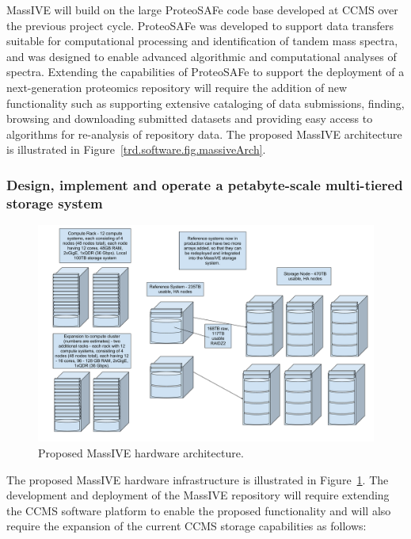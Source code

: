 \documentclass[arial,11pt]{article}
\begin{document}
MassIVE will build on the large ProteoSAFe code base developed at CCMS over the previous project cycle. ProteoSAFe was developed to support data transfers suitable for computational processing and identification of tandem mass spectra, and was designed to enable advanced algorithmic and  computational analyses of spectra. Extending the capabilities of ProteoSAFe to support the deployment of a next-generation proteomics repository will require the addition of new functionality such as supporting extensive cataloging of data submissions, finding, browsing and downloading submitted datasets and providing easy access to algorithms for re-analysis of repository data. The proposed MassIVE architecture is illustrated in Figure~\ref{trd.software.fig.massiveArch}.


\subsubsection{Design, implement and operate a petabyte-scale multi-tiered storage system}

\begin{figure}[t]
  \centering
  \includegraphics[width=\textwidth]{figures/MassIVE_hardware.pdf}
  \caption{\footnotesize Proposed MassIVE hardware architecture.}
  \label{trd.software.fig.massiveHardware}
\end{figure}

The proposed MassIVE hardware infrastructure is illustrated in Figure~\ref{trd.software.fig.massiveHardware}. The development and deployment of the MassIVE repository will require extending the CCMS software platform to enable the proposed functionality and will also require the expansion of the current CCMS storage capabilities as follows:
\end{document}
